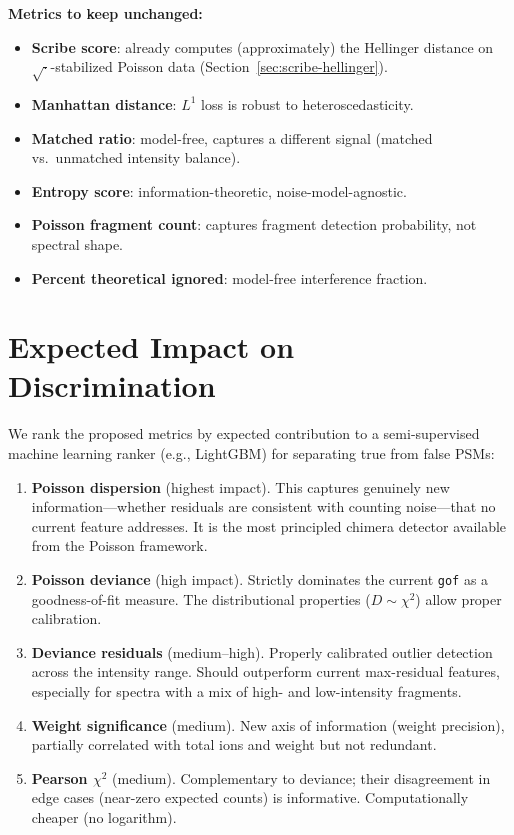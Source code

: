 \documentclass[11pt,a4paper]{article}
\begin{document}
\noindent\textbf{Metrics to keep unchanged:}
\begin{itemize}[]
    \item \textbf{Scribe score}: already computes (approximately) the Hellinger distance
          on $\sqrt{\cdot}$-stabilized Poisson data (Section~\ref{sec:scribe-hellinger}).
    \item \textbf{Manhattan distance}: $L^1$ loss is robust to heteroscedasticity.
    \item \textbf{Matched ratio}: model-free, captures a different signal (matched vs.\
          unmatched intensity balance).
    \item \textbf{Entropy score}: information-theoretic, noise-model-agnostic.
    \item \textbf{Poisson fragment count}: captures fragment detection probability, not
          spectral shape.
    \item \textbf{Percent theoretical ignored}: model-free interference fraction.
\end{itemize}

\section{Expected Impact on Discrimination}
\label{sec:impact}

We rank the proposed metrics by expected contribution to a semi-supervised machine learning
ranker (e.g., LightGBM) for separating true from false PSMs:

\begin{enumerate}
    \item \textbf{Poisson dispersion} (highest impact). This captures genuinely new
          information---whether residuals are consistent with counting noise---that no
          current feature addresses. It is the most principled chimera detector available
          from the Poisson framework.

    \item \textbf{Poisson deviance} (high impact). Strictly dominates the current
          \texttt{gof} as a goodness-of-fit measure. The distributional properties
          ($D \sim \chi^2$) allow proper calibration.

    \item \textbf{Deviance residuals} (medium--high). Properly calibrated outlier detection
          across the intensity range. Should outperform current max-residual features,
          especially for spectra with a mix of high- and low-intensity fragments.

    \item \textbf{Weight significance} (medium). New axis of information (weight precision),
          partially correlated with total ions and weight but not redundant.

    \item \textbf{Pearson $\chi^2$} (medium). Complementary to deviance; their disagreement
          in edge cases (near-zero expected counts) is informative. Computationally cheaper
          (no logarithm).
\end{enumerate}
\end{document}
